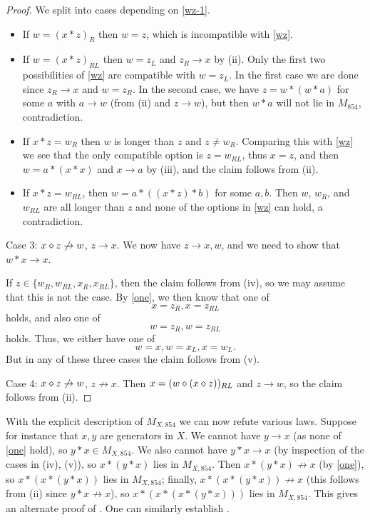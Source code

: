 \begin{proof}
We split into cases depending on \eqref{wz-1}.
\begin{itemize}
\item If $w = (x*z)_R$ then $w=z$, which is incompatible with \eqref{wz}.
\item If $w = (x*z)_{RL}$ then $w = z_L$ and $z_R \to x$ by (ii). Only the first two possibilities of \eqref{wz} are compatible with $w=z_L$.  In the first case we are done since $z_R \to x$ and $w = z_R$.  In the second case, we have $z = w * (w * a)$ for some $a$ with $a \to w$ (from (ii) and $z \to w$), but then $w * a$ will not lie in $M_{854}$, contradiction.
\item If $x*z = w_R$  then $w$ is longer than $z$ and $z \neq w_R$.  Comparing this with \eqref{wz} we see that the only compatible option is $z = w_{RL}$, thus $x=z$, and then $w = a * (x * x)$ and $x \to a$ by (iii), and the claim follows from (ii).
\item If $x * z = w_{RL}$, then $w = a * ((x *z) * b)$ for some $a,b$.  Then $w$, $w_R$, and $w_{RL}$ are all longer than $z$ and none of the options in \eqref{wz} can hold, a contradiction.
\end{itemize}



Case 3: $x \diamond z \not \to w$, $z \to x$.  We now have $z \to x, w$, and we need to show that $w * x \to x$.

If $z \in \{ w_R, w_{RL}, x_R, x_{RL} \}$, then the claim follows from (iv), so we may assume that this is not the case.
By \eqref{one}, we then know that one of
$$ x = z_R, x = z_{RL}$$
holds, and also one of
$$
 w =  z_R, w = z_{RL}$$
 holds. Thus, we either have one of
$$ w = x, w = x_L, x = w_L.$$
But in any of these three cases the claim follows from (v).

Case 4: $x \diamond z \not \to w$, $z \not \to x$.  Then $x = (w \diamond (x \diamond z))_{RL}$ and $z \to w$, so the claim follows from (ii).

\end{proof}

With the explicit description of $M_{X,854}$ we can now refute various laws.  Suppose for instance that $x,y$ are generators in $X$.  We cannot have $y \to x$ (as none of \eqref{one} hold), so $y * x \in M_{X,854}$.  We also cannot have $y * x \to x$ (by inspection of the cases in (iv), (v)), so $x * (y * x)$ lies in $M_{X,854}$.  Then $x * (y * x) \not \to x$ (by \eqref{one}), so $x * (x * (y * x))$ lies in $M_{X,854}$; finally, $x * (x * (y * x)) \not \to x$ (this follows from (ii) since $y * x \not \to x$), so $x * (x * (x * (y * x)))$ lies in $M_{X,854}$.  This gives an alternate proof of .  One can similarly establish .

